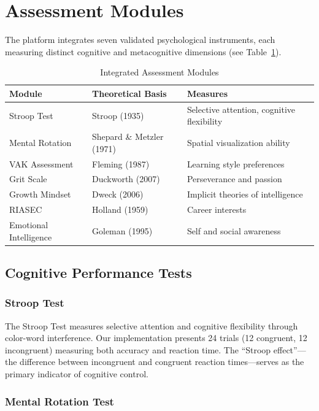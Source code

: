 \documentclass[11pt,a4paper]{article}
\begin{document}
\section{Assessment Modules}

The platform integrates seven validated psychological instruments, each measuring distinct cognitive and metacognitive dimensions (see Table~\ref{tab:modules}).

\begin{table}[H]
\centering
\caption{Integrated Assessment Modules}
\label{tab:modules}
\begin{tabular}{@{}llp{5cm}@{}}
\toprule
\textbf{Module} & \textbf{Theoretical Basis} & \textbf{Measures} \\
\midrule
Stroop Test & Stroop (1935) & Selective attention, cognitive flexibility \\
Mental Rotation & Shepard \& Metzler (1971) & Spatial visualization ability \\
VAK Assessment & Fleming (1987) & Learning style preferences \\
Grit Scale & Duckworth (2007) & Perseverance and passion \\
Growth Mindset & Dweck (2006) & Implicit theories of intelligence \\
RIASEC & Holland (1959) & Career interests \\
Emotional Intelligence & Goleman (1995) & Self and social awareness \\
\bottomrule
\end{tabular}
\end{table}

\subsection{Cognitive Performance Tests}

\subsubsection{Stroop Test}

The Stroop Test \citep{stroop1935} measures selective attention and cognitive flexibility through color-word interference. Our implementation presents 24 trials (12 congruent, 12 incongruent) measuring both accuracy and reaction time. The ``Stroop effect''---the difference between incongruent and congruent reaction times---serves as the primary indicator of cognitive control.

\subsubsection{Mental Rotation Test}
\end{document}
